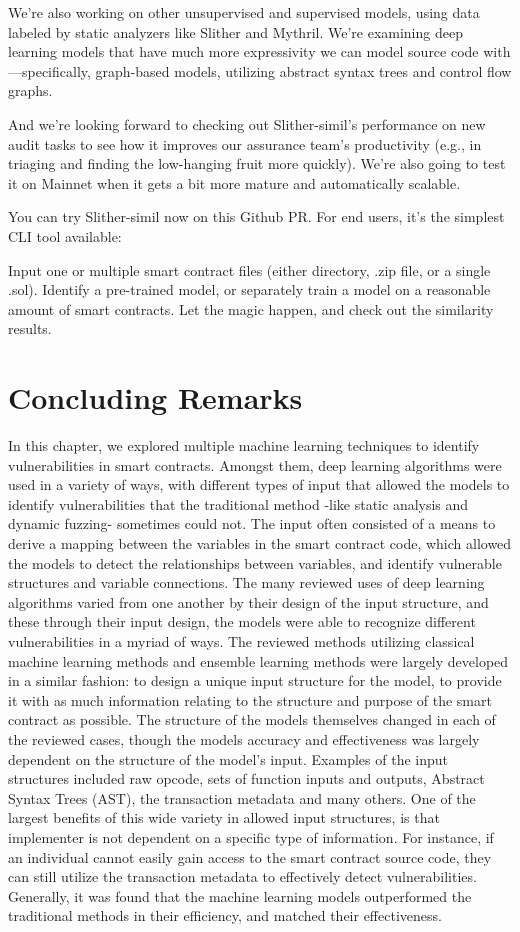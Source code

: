We're also working on other unsupervised and supervised models, using data labeled by static analyzers like Slither and Mythril.
We're examining deep learning models that have much more expressivity we can model source code with—specifically, graph-based models, utilizing abstract syntax trees and control flow graphs.

And we're looking forward to checking out Slither-simil's performance on new audit tasks to see how it improves our assurance team's productivity (e.g., in triaging and finding the low-hanging fruit more quickly).
We're also going to test it on Mainnet when it gets a bit more mature and automatically scalable.

You can try Slither-simil now on this Github PR. For end users, it's the simplest CLI tool available:

Input one or multiple smart contract files (either directory, .zip file, or a single .sol).
Identify a pre-trained model, or separately train a model on a reasonable amount of smart contracts.
Let the magic happen, and check out the similarity results.

\section{Concluding Remarks}

In this chapter, we explored multiple machine learning techniques to identify vulnerabilities in smart contracts.
Amongst them, deep learning algorithms were used in a variety of ways, with different types of input that allowed the models to identify vulnerabilities that the traditional method -like static analysis and dynamic fuzzing- sometimes could not.
The input often consisted of a means to derive a mapping between the variables in the smart contract code, which allowed the models to detect the relationships between variables, and identify vulnerable structures and variable connections.
The many reviewed uses of deep learning algorithms varied from one another by their design of the input structure, and these through their input design, the models were able to recognize different vulnerabilities in a myriad of ways.
The reviewed methods utilizing classical machine learning methods and ensemble learning methods were largely developed in a similar fashion: to design a unique input structure for the model, to provide it with as much information relating to the structure and purpose of the smart contract as possible.
The structure of the models themselves changed in each of the reviewed cases, though the models accuracy and effectiveness was largely dependent on the structure of the model's input.
Examples of the input structures included raw opcode, sets of function inputs and outputs, Abstract Syntax Trees (AST), the transaction metadata and many others.
One of the largest benefits of this wide variety in allowed input structures, is that implementer is not dependent on a specific type of information.
For instance, if an individual cannot easily gain access to the smart contract source code, they can still utilize the transaction metadata to effectively detect vulnerabilities.
Generally, it was found that the machine learning models outperformed the traditional methods in their efficiency, and matched their effectiveness.

